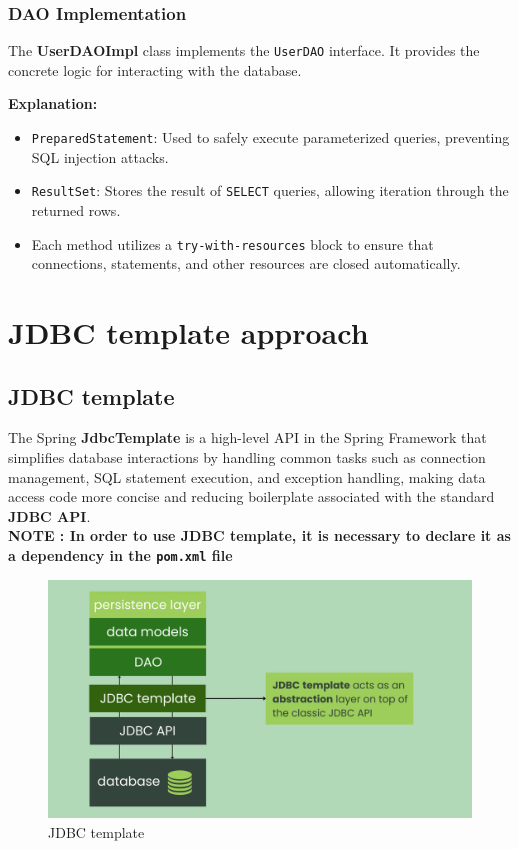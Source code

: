 \documentclass{article}
\begin{document}
\subsubsection{DAO Implementation}

The \textbf{UserDAOImpl} class implements the \texttt{UserDAO} interface. It provides the concrete logic for interacting with the database.

\textbf{Explanation:}
\begin{itemize}
    \item \texttt{PreparedStatement}: Used to safely execute parameterized queries, preventing SQL injection attacks.
    \item \texttt{ResultSet}: Stores the result of \texttt{SELECT} queries, allowing iteration through the returned rows.
    \item Each method utilizes a \texttt{try-with-resources} block to ensure that connections, statements, and other resources are closed automatically.
\end{itemize}

\section{JDBC template approach}

\subsection{JDBC template} 
The Spring \textbf{JdbcTemplate} is a high-level API in the Spring Framework that simplifies database interactions by handling common tasks such as connection management, SQL statement execution, and exception handling, making data access code more concise and reducing boilerplate associated with the standard \textbf{JDBC API}.
\\
\textbf{NOTE : In order to use JDBC template, it is necessary to declare it as a dependency in the \texttt{pom.xml} file}

\begin{figure}[H]
    \centering
    \begin{framed}
        \includegraphics[width=0.8\linewidth]{images/jdbc_template.png}
    \end{framed}
    \caption{JDBC template}
    \label{fig:spring-logo}
\end{figure}
\end{document}
